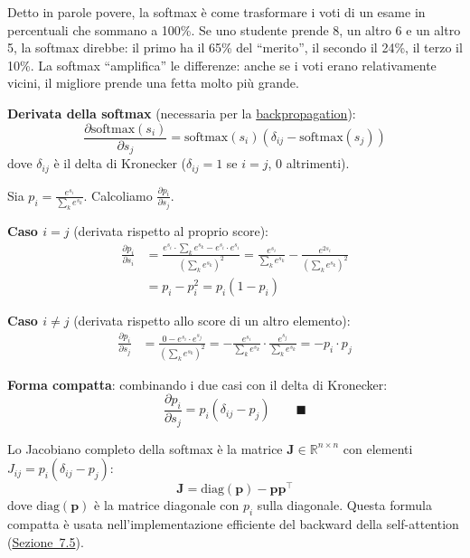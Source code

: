 \documentclass[12pt,a4paper]{article}
\begin{document}
\begin{notabox}
Detto in parole povere, la softmax \`e come trasformare i voti di un esame in percentuali che sommano a 100\%. Se uno studente prende 8, un altro 6 e un altro 5, la softmax direbbe: il primo ha il 65\% del ``merito'', il secondo il 24\%, il terzo il 10\%. La softmax ``amplifica'' le differenze: anche se i voti erano relativamente vicini, il migliore prende una fetta molto pi\`u grande.
\end{notabox}

\textbf{Derivata della softmax} (necessaria per la \hyperref[sec:backward]{backpropagation}):
\[
    \frac{\partial \text{softmax}(s_i)}{\partial s_j} = \text{softmax}(s_i)\left(\delta_{ij} - \text{softmax}(s_j)\right)
\]
dove $\delta_{ij}$ \`e il delta di Kronecker ($\delta_{ij} = 1$ se $i = j$, 0 altrimenti).

\begin{proofbox}
Sia $p_i = \frac{e^{s_i}}{\sum_k e^{s_k}}$. Calcoliamo $\frac{\partial p_i}{\partial s_j}$.

\textbf{Caso $i = j$} (derivata rispetto al proprio score):
\begin{align*}
    \frac{\partial p_i}{\partial s_i} &= \frac{e^{s_i} \cdot \sum_k e^{s_k} - e^{s_i} \cdot e^{s_i}}{(\sum_k e^{s_k})^2} = \frac{e^{s_i}}{\sum_k e^{s_k}} - \frac{e^{2s_i}}{(\sum_k e^{s_k})^2} \\
    &= p_i - p_i^2 = p_i(1 - p_i)
\end{align*}

\textbf{Caso $i \neq j$} (derivata rispetto allo score di un altro elemento):
\begin{align*}
    \frac{\partial p_i}{\partial s_j} &= \frac{0 - e^{s_i} \cdot e^{s_j}}{(\sum_k e^{s_k})^2} = -\frac{e^{s_i}}{\sum_k e^{s_k}} \cdot \frac{e^{s_j}}{\sum_k e^{s_k}} = -p_i \cdot p_j
\end{align*}

\textbf{Forma compatta}: combinando i due casi con il delta di Kronecker:
\[
    \frac{\partial p_i}{\partial s_j} = p_i(\delta_{ij} - p_j) \qquad \blacksquare
\]
\end{proofbox}

\begin{notabox}
Lo Jacobiano completo della softmax \`e la matrice $\mathbf{J} \in \mathbb{R}^{n \times n}$ con elementi $J_{ij} = p_i(\delta_{ij} - p_j)$:
\[
    \mathbf{J} = \text{diag}(\mathbf{p}) - \mathbf{p}\mathbf{p}^\top
\]
dove $\text{diag}(\mathbf{p})$ \`e la matrice diagonale con $p_i$ sulla diagonale. Questa formula compatta \`e usata nell'implementazione efficiente del backward della self-attention (\hyperref[sec:grad_sa]{Sezione~7.5}).
\end{notabox}
\end{document}
